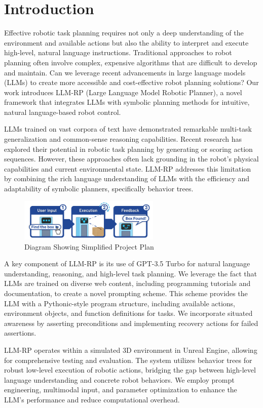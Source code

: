 \documentclass[pdflatex,sn-mathphys-num]{sn-jnl}%
\theoremstyle{thmstyleone}%
\theoremstyle{thmstyletwo}%
\theoremstyle{thmstylethree}%
\begin{document}
\section{Introduction}\label{sec1}
Effective robotic task planning requires not only a deep understanding of the environment and available actions but also the ability to interpret and execute high-level, natural language instructions. Traditional approaches to robot planning often involve complex, expensive algorithms that are difficult to develop and maintain. Can we leverage recent advancements in large language models (LLMs) to create more accessible and cost-effective robot planning solutions? Our work introduces LLM-RP (Large Language Model Robotic Planner), a novel framework that integrates LLMs with symbolic planning methods for intuitive, natural language-based robot control.

LLMs trained on vast corpora of text have demonstrated remarkable multi-task generalization and common-sense reasoning capabilities. Recent research has explored their potential in robotic task planning by generating or scoring action sequences. However, these approaches often lack grounding in the robot's physical capabilities and current environmental state. LLM-RP addresses this limitation by combining the rich language understanding of LLMs with the efficiency and adaptability of symbolic planners, specifically behavior trees.
\begin{figure}[h]
\centering
\includegraphics[width=0.6\textwidth]{figures/Picture13.png}
\caption{Diagram Showing Simplified Project Plan}\label{fig1}
\end{figure}
A key component of LLM-RP is its use of GPT-3.5 Turbo for natural language understanding, reasoning, and high-level task planning. We leverage the fact that LLMs are trained on diverse web content, including programming tutorials and documentation, to create a novel prompting scheme. This scheme provides the LLM with a Pythonic-style program structure, including available actions, environment objects, and function definitions for tasks. We incorporate situated awareness by asserting preconditions and implementing recovery actions for failed assertions.

LLM-RP operates within a simulated 3D environment in Unreal Engine, allowing for comprehensive testing and evaluation. The system utilizes behavior trees for robust low-level execution of robotic actions, bridging the gap between high-level language understanding and concrete robot behaviors. We employ prompt engineering, multimodal input, and parameter optimization to enhance the LLM's performance and reduce computational overhead.
\end{document}

